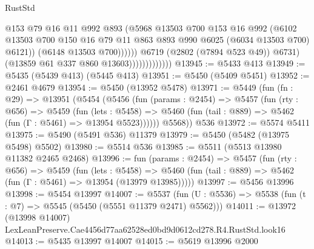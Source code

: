 \begin{lexlean}{RustStd}
\begin{coremodule}
                                        @153
                                        @79
                                        @16
                                        @11
                                        @992
                                        @893
                                        (@5968
                                          @13503
                                          @700
                                          @153
                                          @16
                                          @992
                                          (@6102
                                            @13503
                                            @700
                                            @150
                                            @16
                                            @79
                                            @11
                                            @863
                                            @893
                                            @990
                                            @6025
                                            (@6034 @13503 @700)
                                            @6121))
                                        (@6148 @13503 @700))))))
                              @6719
                              (@2802 (@7894 @523 @49))
                              @6731)
                            (@13859 @61 @337 @860 @13603)))))))))))))
@13945 := @5433 @413
@13949 := @5435 (@5439 @413) (@5445 @413)
@13951 := @5450 (@5409 @5451)
@13952 := @2461 @4679
@13954 := @5450 (@13952 @5478)
@13971 := @5449
    (fun (fn : @29) =>
    @13951
      (@5454
        (@5456
          (fun (params : @2454) =>
          @5457
            (fun (rty : @656) =>
            @5459
              (fun (lets : @5458) =>
              @5460 (fun (tail : @889) => @5462 (fun (Γ : @5461) => @13954 @5523))))))
        @5568))
    @536
@13972 := @5574 @5411
@13975 := @5490 (@5491 @536) @11379
@13979 := @5450 (@5482 (@13975 @5498) @5502)
@13980 := @5514 @536
@13985 := @5511 (@5513 @13980 @11382 @2465 @2468)
@13996 := fun (params : @2454) =>
  @5457
    (fun (rty : @656) =>
    @5459
      (fun (lets : @5458) =>
      @5460 (fun (tail : @889) => @5462 (fun (Γ : @5461) => @13954 (@13979 @13985)))))
@13997 := @5456 @13996
@13998 := @5454 @13997
@14007 := @5537
    (fun (U : @5536) => @5538 (fun (t : @7) => @5545 (@5450 (@5551 @11379 @2471) @5562)))
@14011 := @13972 (@13998 @14007) LexLeanPreserve.Cae4456d77aa62528ed0bd9d0612cd278.R4.RustStd.look16
@14013 := @5435 @13997 @14007
@14015 := @5619 @13996 @2000

\end{coremodule}
\end{lexlean}
